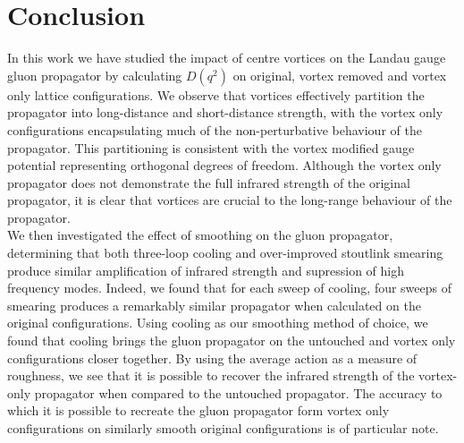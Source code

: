 
\chapter{Conclusion}\label{chapter:Conclusions}

\ifpdf
    \graphicspath{{Chapter8/Figs/Raster/}{Chapter8/Figs/PDF/}{Chapter8/Figs/}}
\else
    \graphicspath{{Chapter8/Figs/Vector/}{Chapter8/Figs/}}
\fi

In this work we have studied the impact of centre vortices on the Landau gauge gluon propagator by calculating $D(q^2)$ on original, vortex removed and vortex only lattice configurations. We observe that vortices effectively partition the propagator into long-distance and short-distance strength, with the vortex only configurations encapsulating much of the non-perturbative behaviour of the propagator. This partitioning is consistent with the vortex modified gauge potential representing orthogonal degrees of freedom. Although the vortex only propagator does not demonstrate the full infrared strength of the original propagator, it is clear that vortices are crucial to the long-range behaviour of the propagator.\\

We then investigated the effect of smoothing on the gluon propagator, determining that both three-loop cooling and over-improved stoutlink smearing produce similar amplification of infrared strength and supression of high frequency modes. Indeed, we found that for each sweep of cooling, four sweeps of smearing produces a remarkably similar propagator when calculated on the original configurations. Using cooling as our smoothing method of choice, we found that cooling brings the gluon propagator on the untouched and vortex only configurations closer together. By using the average action as a measure of roughness, we see that it is possible to recover the infrared strength of the vortex-only propagator when compared to the untouched propagator. The accuracy to which it is possible to recreate the gluon propagator form vortex only configurations on similarly smooth original configurations is of particular note.\\

